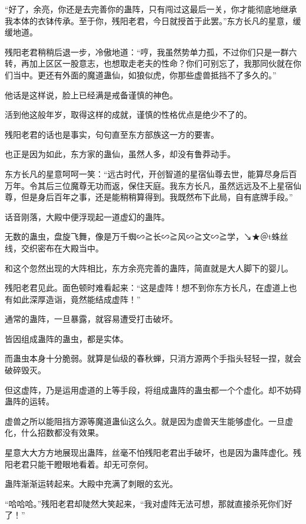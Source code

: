 
\begin{this_body}

“好了，余亮，你还是去完善你的蛊阵，只有闯过这最后一关，你才能彻底地继承我本体的衣钵传承。至于你，残阳老君，今日就授首于此罢。”东方长凡的星意，缓缓地道。

残阳老君稍稍后退一步，冷傲地道：“哼，我虽然势单力孤，不过你们只是一群六转，再加上区区一股意志，也想取走老夫的性命？你们可别忘了，我那同伙就在你们当中。更还有外面的魔道蛊仙，如狼似虎，你那些虚兽抵挡不了多久的。”

他话是这样说，脸上已经满是戒备谨慎的神色。

活到他这般年岁，取得这样的成就，谨慎的性格优点是绝少不了的。

残阳老君的话也是事实，句句直至东方部族这一方的要害。

也正是因为如此，东方家的蛊仙，虽然人多，却没有鲁莽动手。

东方长凡的星意呵呵一笑：“远古时代，开创智道的星宿仙尊去世，能算尽身后百万年。令其后三位魔尊无功而返，保住天庭。我东方长凡，虽然远远及不上星宿仙尊，但是身后百年之事，还是能稍稍算得到。我既然布下此局，自有底牌手段。”

话音刚落，大殿中便浮现起一道虚幻的蛊阵。

无数的蛊虫，盘旋飞舞，像是万千蜘∽≧长∽≧风∽≧文∽≧学，↘★＠t蛛丝线，交织密布在大殿当中。

和这个忽然出现的大阵相比，东方余亮完善的蛊阵，简直就是大人脚下的婴儿。

残阳老君见此。面色顿时难看起来：“这是虚阵！想不到你东方长凡，在虚道上也有如此深厚造诣，竟然能结成虚阵！”

通常的蛊阵，一旦暴露，就容易遭受打击破坏。

皆因组成蛊阵的蛊虫，都是实体。

而蛊虫本身十分脆弱。就算是仙级的春秋蝉，只消方源两个手指头轻轻一捏，就会破碎毁灭。

但这虚阵，乃是运用虚道的上等手段，将组成蛊阵的蛊虫都一个个虚化。却不妨碍蛊阵的运转。

虚兽之所以能阻挡方源等魔道蛊仙这么久。就是因为虚兽天生能够虚化。一旦虚化，什么招数都没有效果。

星意大大方方地展现出蛊阵，丝毫不怕残阳老君出手破坏，也是因为蛊阵虚化。残阳老君只能干瞪眼地看着。却无可奈何。

蛊阵渐渐运转起来。大殿中充满了刺眼的玄光。

“哈哈哈。”残阳老君却陡然大笑起来，“我对虚阵无法可想，那就直接杀死你们好了！”


\end{this_body}
